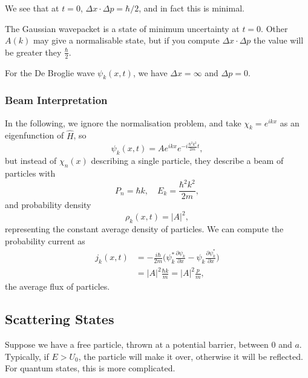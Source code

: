 \documentclass[12pt]{article}
\begin{document}

We see that at $t = 0$, $\Delta x \cdot \Delta p = \hbar/2$, and in fact this is minimal.

The Gaussian wavepacket is a state of minimum uncertainty at $t = 0$. Other $A(k)$ may give a normalisable state, but if you compute $\Delta x \cdot \Delta p$ the value will be greater they $\frac{\hbar}{2}$.

For the De Broglie wave $\psi_k(x, t)$, we have $\Delta x = \infty$ and $\Delta p = 0$.

\subsubsection{Beam Interpretation}%
\label{subsub:beam_interpretation}

In the following, we ignore the normalisation problem, and take $\chi_k = e^{ikx}$ as an eigenfunction of $\hat H$, so
\[
	\psi_k(x, t) = A e^{ikx} e^{-i \frac{\hbar^2 k^2}{2m} t}
,\]
but instead of $\chi_n(x)$ describing a single particle, they describe a beam of particles with
\[
	P_n = \hbar k, \quad E_k = \frac{\hbar^2 k^2}{2m}
,\]
and probability density
\[
	\rho_k(x, t) = |A|^2
,\]
representing the constant average density of particles. We can compute the probability current as
\begin{align*}
	j_k(x, t) &= -\frac{i\hbar}{2m} \biggl( \psi_k^{\ast} \frac{\partial \psi_k}{\partial x} - \psi_k \frac{\partial \psi^{\ast}_k}{\partial x} \biggr) \\
		  &= |A|^2 \frac{\hbar k}{m} = |A|^2 \frac{p}{m},
\end{align*}
the average flux of particles.

\subsection{Scattering States}%
\label{sub:scattering_states}

Suppose we have a free particle, thrown at a potential barrier, between $0$ and $a$. Typically, if $E > U_0$, the particle will make it over, otherwise it will be reflected. For quantum states, this is more complicated.
\end{document}
